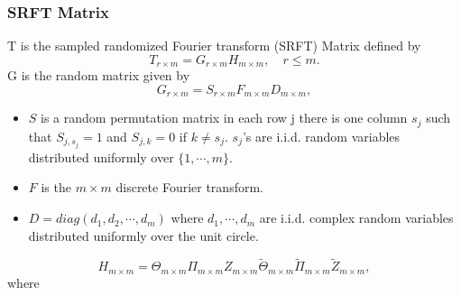 \subsubsection{SRFT Matrix}
T is the sampled randomized Fourier transform (SRFT) Matrix defined by
$$T _{r \times m} = G_{r \times m} H_{m \times m}, \quad  r \leq m. $$
G is the random matrix given by
$$ G_{r \times m} = S_{r \times m} F_{m \times m} D_{m \times m}, $$



\begin{itemize}
\item $S$ is a random permutation matrix in each row j there is one column $s_j$ such that $S_{j,s_j} = 1$ and $S_{j,k} =0$ if $k \neq s_j$. $s_j$'s are i.i.d. random variables distributed uniformly over $\{ 1,\cdots,m\}. $ \\
\item $F$ is the $m \times m$ discrete Fourier transform. \\
\item $D = diag(d_1,d_2,\cdots,d_m)$
           where $d_1,\cdots,d_m$ are i.i.d. complex random variables distributed uniformly over the unit circle.
\end{itemize}



$$
H_{m \times m} =\Theta_{m \times m} \Pi_{m \times m} Z_{m \times m} \tilde{\Theta}_{m \times m}\tilde{\Pi}_{m \times m} \tilde{Z}_{m \times m},
$$
where


